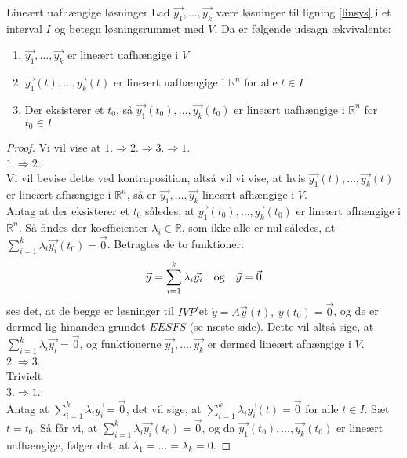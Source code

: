 \begin{lemma}{Lineært uafhængige løsninger}{}
Lad $\vec{y_1}, \hdots ,\vec{y_k}$ være løsninger til ligning  \eqref{linsys} i et interval $I$ og betegn løsningsrummet med $V$. Da er følgende udsagn ækvivalente:
\begin{enumerate}
    \item $\vec{y_1}, \hdots ,\vec{y_k}$ er lineært uafhængige i $V$
    \item $\vec{y_1}(t), \hdots ,\vec{y_k}(t)$ er lineært uafhængige i $\mathbb{R}^n$ for alle $t \in I$
    \item Der eksisterer et $t_0$, så $\vec{y_1}(t_0), \hdots ,\vec{y_k}(t_0)$ er lineært uafhængige i $\mathbb{R}^n$ for $t_0 \in I$
\end{enumerate}
\end{lemma}
\begin{proof}
Vi vil vise at $1. \Rightarrow 2. \Rightarrow 3. \Rightarrow 1. $ \\ \hfill \break
$1. \Rightarrow 2.$: \\ Vi vil bevise dette ved kontraposition, altså vil vi vise, at hvis $\vec{y_1}(t), \hdots ,\vec{y_k}(t)$ er lineært afhængige i $\mathbb{R}^n$, så er $\vec{y_1}, \hdots ,\vec{y_k}$ lineært afhængige i $V$. \\
\hfill \break
Antag at der eksisterer et $t_0$ således, at $\vec{y_1}(t_0), \hdots ,\vec{y_k}(t_0)$ er lineært afhængige i $\mathbb{R}^n$. Så findes der koefficienter $\lambda_i \in \mathbb{R}$, som ikke alle er nul således, at $\sum_{i=1}^k \lambda_i\vec{y_i}(t_0)=\vec{0}$. Betragtes de to funktioner:
\begin{equation*}
    \vec{y}= \sum_{i=1}^k \lambda_i\vec{y_i} \ \ \ \textnormal{og} \ \ \ \vec{y}=\vec{0}
\end{equation*}
ses det, at de begge er løsninger til $IVP$'et $\dot{y}=A\vec{y}(t), \ y(t_0)=\vec{0}$, og de er dermed lig hinanden grundet $EESFS$ (se næste side). Dette vil altså sige, at $\sum_{i=1}^k \lambda_i\vec{y_i}= \vec{0}$, og funktionerne $\vec{y_1}, \hdots ,\vec{y_k}$ er dermed lineært afhængige i $V$. \\ 
\hfill \break
$2. \Rightarrow 3.$: \\ Trivielt \\ 
\hfill \break
$3. \Rightarrow 1.$: \\
Antag at $\sum_{i=1}^k \lambda_i\vec{y_i}=\vec{0}$, det vil sige, at $\sum_{i=1}^k \lambda_i\vec{y_i}(t)=\vec{0}$ for alle $t \in I$. Sæt $t=t_0$. Så får vi, at $\sum_{i=1}^k \lambda_i\vec{y_i}(t_0)=\vec{0}$, og da $\vec{y_1}(t_0), \hdots ,\vec{y_k}(t_0)$ er lineært uafhængige, følger det, at $ \lambda_1 = \hdots = \lambda_k = 0$.
\end{proof}

